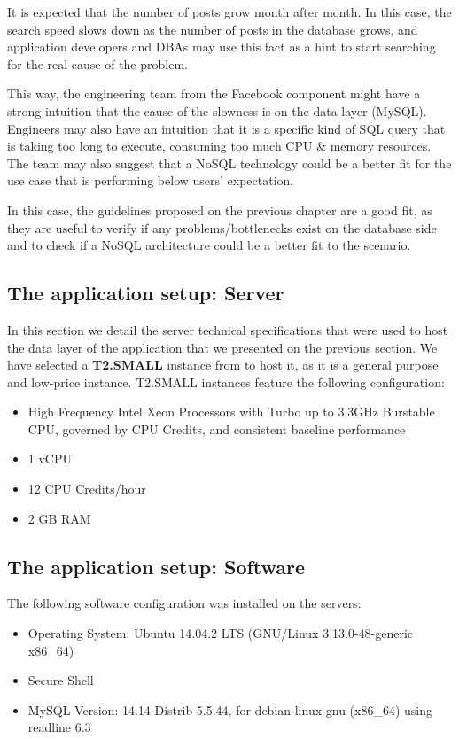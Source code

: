 It is expected that the number of posts grow month after month. In this case, the search speed slows down as the number of posts in the database grows, and application developers and DBAs may use this fact as a hint to start searching for the real cause of the problem. 

This way, the engineering team from the Facebook component might have a strong intuition that the cause of the slowness is on the data layer (MySQL). Engineers may also have an intuition that it is a specific kind of SQL query that is taking too long to execute, consuming too much CPU \& memory resources. The team may also suggest that a NoSQL technology could be a better fit for the use case that is performing below users' expectation. 

In this case, the guidelines proposed on the previous chapter are a good fit, as they are useful to verify if any problems/bottlenecks exist on the database side and to check if a NoSQL architecture could be a better fit to the scenario.


\subsection{The application setup: Server}
\label{appserver}
In this section we detail the server technical specifications that were used to host the data layer of the application that we presented on the previous section. We have selected a \textbf{T2.SMALL} instance from \cite{amazonec2} to host it, as it is a general purpose and low-price instance. T2.SMALL instances feature the following configuration:

\begin{itemize}
\item{High Frequency Intel Xeon Processors with Turbo up to 3.3GHz Burstable CPU, governed by CPU Credits, and consistent baseline performance}
\item{1 vCPU}
\item{12 CPU Credits/hour}
\item{2 GB RAM}
\end{itemize}

\subsection{The application setup: Software}
The following software configuration was installed on the servers: 

\begin{itemize}
\item{Operating System: Ubuntu 14.04.2 LTS (GNU/Linux 3.13.0-48-generic x86\_64)}
\item{Secure Shell}
\item{MySQL Version: 14.14 Distrib 5.5.44, for debian-linux-gnu (x86\_64) using readline 6.3}
\end{itemize}

